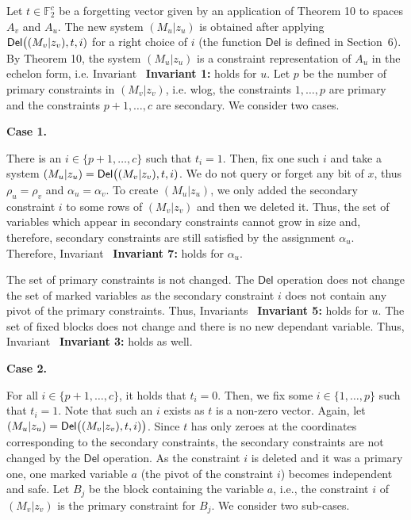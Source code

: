 \documentclass[10pt,a4paper]{article}
\begin{document}
Let $t\in\mathbb{F}_{2}^{c}$ be a forgetting vector given by an application of Theorem 10 to spaces $A_{v}$ and $A_{u}$.
The new system $(M_{u}|z_{u})$ is obtained after applying $\mathsf{Del}\bigl{(}(M_{v}|z_{v}),t,i)$ for a right choice of $i$ (the function $\mathsf{Del}$ is defined in Section 6).
By Theorem 10, the system $(M_{u}|z_{u})$ is a constraint representation of $A_{u}$ in the echelon form, i.e. Invariant \textbf{ Invariant 1:} holds for $u$.
Let $p$ be the number of primary constraints in $(M_{v}|z_{v})$, i.e. wlog, the constraints $1,\dots,p$ are primary and the constraints $p+1,\dots,c$ are secondary.
We consider two cases.\par




\par\medskip\noindent\textbf{Case 1.}\par




There is an $i\in\{p+1,\dots,c\}$ such that $t_{i}=1$.
Then, fix one such $i$ and take a system $(M_{u}|z_{u})=\mathsf{Del}\bigl{(}(M_{v}|z_{v}),t,i)$.
We do not query or forget any bit of $x$, thus $\rho_{u}=\rho_{v}$ and $\alpha_{u}=\alpha_{v}$.
To create $(M_{u}|z_{u})$, we only added the secondary constraint $i$ to some rows of $(M_{v}|z_{v})$ and then we deleted it.
Thus, the set of variables which appear in secondary constraints cannot grow in size and, therefore, secondary constraints are still satisfied by the assignment $\alpha_{u}$.
Therefore, Invariant \textbf{ Invariant 7:} holds for $\alpha_{u}$.\par




The set of primary constraints is not changed.
The $\mathsf{Del}$ operation does not change the set of marked variables as the secondary constraint $i$ does not contain any pivot of the primary constraints.
Thus, Invariants \textbf{ Invariant 5:} holds for $u$.
The set of fixed blocks does not change and there is no new dependant variable. Thus, Invariant \textbf{ Invariant 3:} holds as well.\par





\par\medskip\noindent\textbf{Case 2.}\par




For all $i\in\{p+1,\dots,c\}$, it holds that $t_{i}=0$.
Then, we fix some $i\in\{1,\dots,p\}$ such that $t_{i}=1$.
Note that such an $i$ exists as $t$ is a non-zero vector.
Again, let $(M_{u}|z_{u})=\mathsf{Del}\bigl{(}(M_{v}|z_{v}),t,i)\bigr{)}$.
Since $t$ has only zeroes at the coordinates corresponding to the secondary constraints, the secondary constraints are not changed by the $\mathsf{Del}$ operation.
As the constraint $i$ is deleted and it was a primary one, one marked variable $a$ (the pivot of the constraint $i$) becomes independent and safe.
Let $B_{j}$ be the block containing the variable $a$, i.e., the constraint $i$ of $(M_{v}|z_{v})$ is the primary constraint for $B_{j}$.
We consider two sub-cases.\par
\end{document}
